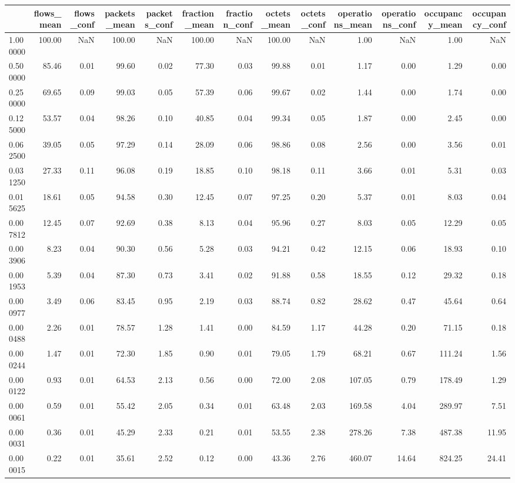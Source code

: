 \begin{tabular}{lrrrrrrrrrrrr}
\toprule
 & flows_mean & flows_conf & packets_mean & packets_conf & fraction_mean & fraction_conf & octets_mean & octets_conf & operations_mean & operations_conf & occupancy_mean & occupancy_conf \\
\midrule
1.000000 & 100.00 & NaN & 100.00 & NaN & 100.00 & NaN & 100.00 & NaN & 1.00 & NaN & 1.00 & NaN \\
0.500000 & 85.46 & 0.01 & 99.60 & 0.02 & 77.30 & 0.03 & 99.88 & 0.01 & 1.17 & 0.00 & 1.29 & 0.00 \\
0.250000 & 69.65 & 0.09 & 99.03 & 0.05 & 57.39 & 0.06 & 99.67 & 0.02 & 1.44 & 0.00 & 1.74 & 0.00 \\
0.125000 & 53.57 & 0.04 & 98.26 & 0.10 & 40.85 & 0.04 & 99.34 & 0.05 & 1.87 & 0.00 & 2.45 & 0.00 \\
0.062500 & 39.05 & 0.05 & 97.29 & 0.14 & 28.09 & 0.06 & 98.86 & 0.08 & 2.56 & 0.00 & 3.56 & 0.01 \\
0.031250 & 27.33 & 0.11 & 96.08 & 0.19 & 18.85 & 0.10 & 98.18 & 0.11 & 3.66 & 0.01 & 5.31 & 0.03 \\
0.015625 & 18.61 & 0.05 & 94.58 & 0.30 & 12.45 & 0.07 & 97.25 & 0.20 & 5.37 & 0.01 & 8.03 & 0.04 \\
0.007812 & 12.45 & 0.07 & 92.69 & 0.38 & 8.13 & 0.04 & 95.96 & 0.27 & 8.03 & 0.05 & 12.29 & 0.05 \\
0.003906 & 8.23 & 0.04 & 90.30 & 0.56 & 5.28 & 0.03 & 94.21 & 0.42 & 12.15 & 0.06 & 18.93 & 0.10 \\
0.001953 & 5.39 & 0.04 & 87.30 & 0.73 & 3.41 & 0.02 & 91.88 & 0.58 & 18.55 & 0.12 & 29.32 & 0.18 \\
0.000977 & 3.49 & 0.06 & 83.45 & 0.95 & 2.19 & 0.03 & 88.74 & 0.82 & 28.62 & 0.47 & 45.64 & 0.64 \\
0.000488 & 2.26 & 0.01 & 78.57 & 1.28 & 1.41 & 0.00 & 84.59 & 1.17 & 44.28 & 0.20 & 71.15 & 0.18 \\
0.000244 & 1.47 & 0.01 & 72.30 & 1.85 & 0.90 & 0.01 & 79.05 & 1.79 & 68.21 & 0.67 & 111.24 & 1.56 \\
0.000122 & 0.93 & 0.01 & 64.53 & 2.13 & 0.56 & 0.00 & 72.00 & 2.08 & 107.05 & 0.79 & 178.49 & 1.29 \\
0.000061 & 0.59 & 0.01 & 55.42 & 2.05 & 0.34 & 0.01 & 63.48 & 2.03 & 169.58 & 4.04 & 289.97 & 7.51 \\
0.000031 & 0.36 & 0.01 & 45.29 & 2.33 & 0.21 & 0.01 & 53.55 & 2.38 & 278.26 & 7.38 & 487.38 & 11.95 \\
0.000015 & 0.22 & 0.01 & 35.61 & 2.52 & 0.12 & 0.00 & 43.36 & 2.76 & 460.07 & 14.64 & 824.25 & 24.41 \\

\end{tabular}

